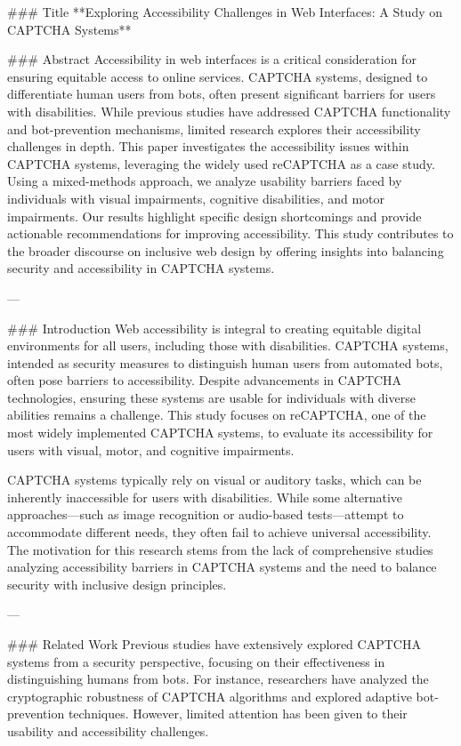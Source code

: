 ### Title
**Exploring Accessibility Challenges in Web Interfaces: A Study on CAPTCHA Systems**

### Abstract
Accessibility in web interfaces is a critical consideration for ensuring equitable access to online services. CAPTCHA systems, designed to differentiate human users from bots, often present significant barriers for users with disabilities. While previous studies have addressed CAPTCHA functionality and bot-prevention mechanisms, limited research explores their accessibility challenges in depth. This paper investigates the accessibility issues within CAPTCHA systems, leveraging the widely used reCAPTCHA as a case study. Using a mixed-methods approach, we analyze usability barriers faced by individuals with visual impairments, cognitive disabilities, and motor impairments. Our results highlight specific design shortcomings and provide actionable recommendations for improving accessibility. This study contributes to the broader discourse on inclusive web design by offering insights into balancing security and accessibility in CAPTCHA systems.

---

### Introduction
Web accessibility is integral to creating equitable digital environments for all users, including those with disabilities. CAPTCHA systems, intended as security measures to distinguish human users from automated bots, often pose barriers to accessibility. Despite advancements in CAPTCHA technologies, ensuring these systems are usable for individuals with diverse abilities remains a challenge. This study focuses on reCAPTCHA, one of the most widely implemented CAPTCHA systems, to evaluate its accessibility for users with visual, motor, and cognitive impairments.

CAPTCHA systems typically rely on visual or auditory tasks, which can be inherently inaccessible for users with disabilities. While some alternative approaches—such as image recognition or audio-based tests—attempt to accommodate different needs, they often fail to achieve universal accessibility. The motivation for this research stems from the lack of comprehensive studies analyzing accessibility barriers in CAPTCHA systems and the need to balance security with inclusive design principles.

---

### Related Work
Previous studies have extensively explored CAPTCHA systems from a security perspective, focusing on their effectiveness in distinguishing humans from bots. For instance, researchers have analyzed the cryptographic robustness of CAPTCHA algorithms and explored adaptive bot-prevention techniques. However, limited attention has been given to their usability and accessibility challenges.

